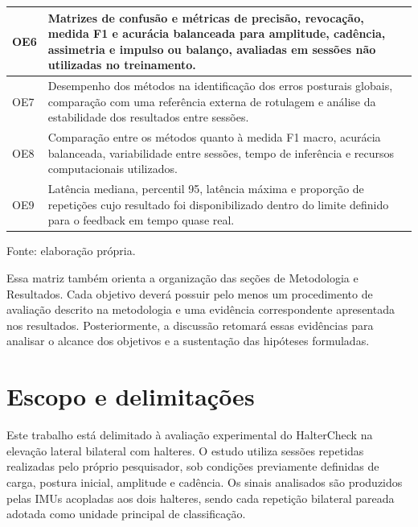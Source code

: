 \begin{quadro}[htb]
\begin{tabular}{|p{}|p{}|}
        OE6 &
        Matrizes de confusão e métricas de precisão, revocação, medida F1
        e acurácia balanceada para amplitude, cadência, assimetria e
        impulso ou balanço, avaliadas em sessões não utilizadas no
        treinamento.
        \\
        \hline

        OE7 &
        Desempenho dos métodos na identificação dos erros posturais globais,
        comparação com uma referência externa de rotulagem e análise da
        estabilidade dos resultados entre sessões.
        \\
        \hline

        OE8 &
        Comparação entre os métodos quanto à medida F1 macro, acurácia
        balanceada, variabilidade entre sessões, tempo de inferência e
        recursos computacionais utilizados.
        \\
        \hline

        OE9 &
        Latência mediana, percentil 95, latência máxima e proporção de
        repetições cujo resultado foi disponibilizado dentro do limite
        definido para o feedback em tempo quase real.
        \\
        \hline
    \end{tabular}

    \begin{flushleft}
        \footnotesize Fonte: elaboração própria.
    \end{flushleft}
\end{quadro}

Essa matriz também orienta a organização das seções de Metodologia e
Resultados. Cada objetivo deverá possuir pelo menos um procedimento de
avaliação descrito na metodologia e uma evidência correspondente
apresentada nos resultados. Posteriormente, a discussão retomará essas
evidências para analisar o alcance dos objetivos e a sustentação das
hipóteses formuladas.

\newpage

\section{Escopo e delimitações}
\label{sec:escopo-delimitacoes}

Este trabalho está delimitado à avaliação experimental do HalterCheck
na elevação lateral bilateral com halteres. O estudo utiliza sessões
repetidas realizadas pelo próprio pesquisador, sob condições previamente
definidas de carga, postura inicial, amplitude e cadência. Os sinais
analisados são produzidos pelas IMUs acopladas aos dois halteres, sendo
cada repetição bilateral pareada adotada como unidade principal de
classificação.

